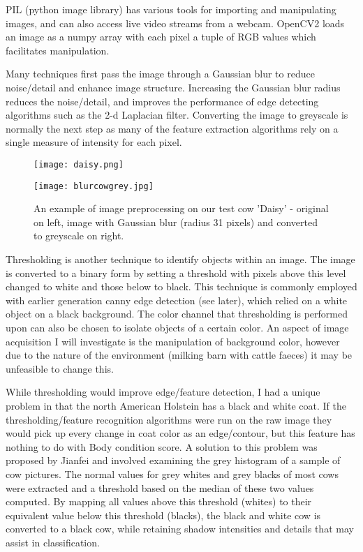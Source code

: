 \documentclass[11pt]{article}
\begin{document}
	PIL (python image library) has various tools for importing and manipulating images, and can also access live video streams from a webcam.
	OpenCV2 loads an image as a numpy array with each pixel a tuple of RGB values which facilitates manipulation.


	Many techniques first pass the image through a Gaussian blur to reduce noise/detail and enhance image structure. 
	Increasing the Gaussian blur radius reduces the noise/detail, and improves the performance of edge detecting algorithms such as the 2-d Laplacian filter.
	Converting the image to greyscale is normally the next step as many of the feature extraction algorithms rely on a single measure of intensity for each pixel.

	\begin{figure}[h]
		\centering
		\parbox{5cm}{\texttt{[image: daisy.png]}}
		\parbox{5cm}{\texttt{[image: blurcowgrey.jpg]}}
		\caption{An example of image preprocessing on our test cow 'Daisy' - original on left, image with Gaussian blur (radius 31 pixels) and converted to greyscale on right.}
	\end{figure}
	\newpage


	Thresholding is another technique to identify objects within an image.
	The image is converted to a binary form by setting a threshold with pixels above this level changed to white and those below to black.
	This technique is commonly employed with earlier generation canny edge detection (see later), which relied on a white object on a black background.
	The color channel that thresholding is performed upon can also be chosen to isolate objects of a certain color.
	An aspect of image acquisition I will investigate is the manipulation of background color, however due to the nature of the environment (milking barn with cattle faeces) it may be unfeasible to change this.


	While thresholding would improve edge/feature detection, I had a unique problem in that the north American Holstein has a black and white coat.
	If the thresholding/feature recognition algorithms were run on the raw image they would pick up every change in coat color as an edge/contour, but this feature has nothing to do with Body condition score.
 	A solution to this problem was proposed by Jianfei \cite{Jianfei2011} and involved examining the grey histogram of a sample of cow pictures.
	The normal values for grey whites and grey blacks of most cows were extracted and a threshold based on the median of these two values computed.
	By mapping all values above this threshold (whites) to their equivalent value below this threshold (blacks), the black and white cow is converted to a black cow, while retaining shadow intensities and details that may assist in classification.
\end{document}
